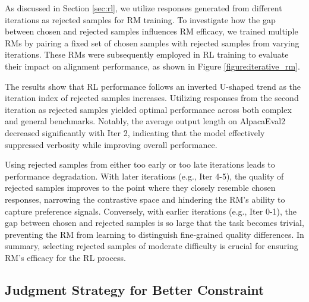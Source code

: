 As discussed in Section \ref{sec:rl}, we utilize responses generated from different iterations as rejected samples for RM training. To investigate how the gap between chosen and rejected samples influences RM efficacy, we trained multiple RMs by pairing a fixed set of chosen samples with rejected samples from varying iterations. These RMs were subsequently employed in RL training to evaluate their impact on alignment performance, as shown in Figure \ref{figure:iterative_rm}.

The results show that RL performance follows an inverted U-shaped trend as the iteration index of rejected samples increases. Utilizing responses from the second iteration as rejected samples yielded optimal performance across both complex and general benchmarks. Notably, the average output length on AlpacaEval2 decreased significantly with Iter 2, indicating that the model effectively suppressed verbosity while improving overall performance.

Using rejected samples from either too early or too late iterations leads to performance degradation. With later iterations (e.g., Iter 4-5), the quality of rejected samples improves to the point where they closely resemble chosen responses, narrowing the contrastive space and hindering the RM's ability to capture preference signals. Conversely, with earlier iterations (e.g., Iter 0-1), the gap between chosen and rejected samples is so large that the task becomes trivial, preventing the RM from learning to distinguish fine-grained quality differences. In summary, selecting rejected samples of moderate difficulty is crucial for ensuring RM's efficacy for the RL process.

\subsection{Judgment Strategy for Better Constraint}
\label{sec:judge}

